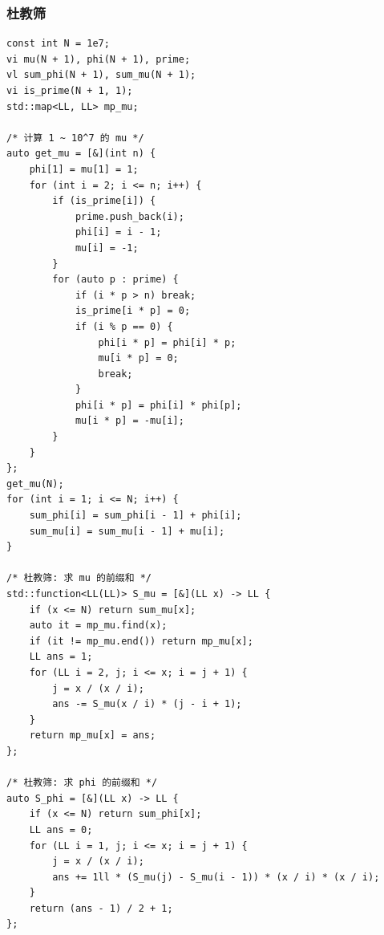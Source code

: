 \documentclass[UTF8, a4paper, titlepage, twoside]{ctexart}
\begin{document}
\subsubsection*{ 杜教筛 }
\begin{lstlisting}[style=cpp]
const int N = 1e7;
vi mu(N + 1), phi(N + 1), prime;
vl sum_phi(N + 1), sum_mu(N + 1);
vi is_prime(N + 1, 1);
std::map<LL, LL> mp_mu;

/* 计算 1 ~ 10^7 的 mu */
auto get_mu = [&](int n) {
    phi[1] = mu[1] = 1;
    for (int i = 2; i <= n; i++) {
        if (is_prime[i]) {
            prime.push_back(i);
            phi[i] = i - 1;
            mu[i] = -1;
        }
        for (auto p : prime) {
            if (i * p > n) break;
            is_prime[i * p] = 0;
            if (i % p == 0) {
                phi[i * p] = phi[i] * p;
                mu[i * p] = 0;
                break;
            }
            phi[i * p] = phi[i] * phi[p];
            mu[i * p] = -mu[i];
        }
    }
};
get_mu(N);
for (int i = 1; i <= N; i++) {
    sum_phi[i] = sum_phi[i - 1] + phi[i];
    sum_mu[i] = sum_mu[i - 1] + mu[i];
}

/* 杜教筛: 求 mu 的前缀和 */
std::function<LL(LL)> S_mu = [&](LL x) -> LL {
    if (x <= N) return sum_mu[x];
    auto it = mp_mu.find(x);
    if (it != mp_mu.end()) return mp_mu[x];
    LL ans = 1;
    for (LL i = 2, j; i <= x; i = j + 1) {
        j = x / (x / i);
        ans -= S_mu(x / i) * (j - i + 1);
    }
    return mp_mu[x] = ans;
};

/* 杜教筛: 求 phi 的前缀和 */
auto S_phi = [&](LL x) -> LL {
    if (x <= N) return sum_phi[x];
    LL ans = 0;
    for (LL i = 1, j; i <= x; i = j + 1) {
        j = x / (x / i);
        ans += 1ll * (S_mu(j) - S_mu(i - 1)) * (x / i) * (x / i);
    }
    return (ans - 1) / 2 + 1;
};
\end{lstlisting}
\end{document}
